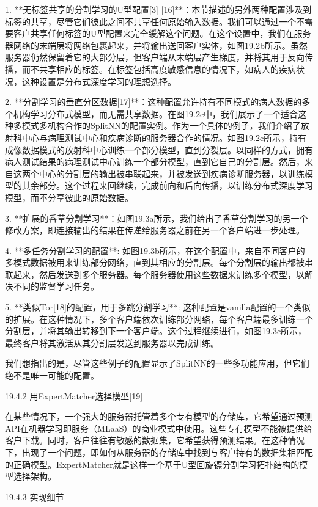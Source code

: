 1. **无标签共享的分割学习的U型配置[3] [16]**：本节描述的另外两种配置涉及到标签的共享，尽管它们彼此之间不共享任何原始输入数据。我们可以通过一个不需要客户共享任何标签的U型配置来完全缓解这个问题。在这个设置中，我们在服务器网络的末端层将网络包裹起来，并将输出送回客户实体，如图19.2b所示。虽然服务器仍然保留着它的大部分层，但客户端从末端层产生梯度，并将其用于反向传播，而不共享相应的标签。在标签包括高度敏感信息的情况下，如病人的疾病状况，这种设置是分布式深度学习的理想选择。

2. **分割学习的垂直分区数据[17]**：这种配置允许持有不同模式的病人数据的多个机构学习分布式模型，而无需共享数据。在图19.2c中，我们展示了一个适合这种多模式多机构合作的SplitNN的配置实例。作为一个具体的例子，我们介绍了放射科中心与病理测试中心和疾病诊断的服务器合作的情况。如图19.2c所示，持有成像数据模式的放射科中心训练一个部分模型，直到分裂层。以同样的方式，拥有病人测试结果的病理测试中心训练一个部分模型，直到它自己的分割层。然后，来自这两个中心的分割层的输出被串联起来，并被发送到疾病诊断服务器，以训练模型的其余部分。这个过程来回继续，完成前向和后向传播，以训练分布式深度学习模型，而不分享彼此的原始数据。

3. **扩展的香草分割学习**：如图19.3a所示，我们给出了香草分割学习的另一个修改方案，即连接输出的结果在传递给服务器之前在另一个客户端进一步处理。

4. **多任务分割学习的配置**: 如图19.3b所示，在这个配置中，来自不同客户的多模式数据被用来训练部分网络，直到其相应的分割层。每个分割层的输出都被串联起来，然后发送到多个服务器。每个服务器使用这些数据来训练多个模型，以解决不同的监督学习任务。

5. **类似Tor[18]的配置，用于多跳分割学习**: 这种配置是vanilla配置的一个类似的扩展。在这种情况下，多个客户端依次训练部分网络，每个客户端最多训练一个分割层，并将其输出转移到下一个客户端。这个过程继续进行，如图19.3c所示，最终客户将其激活从其分割层发送到服务器以完成训练。

我们想指出的是，尽管这些例子的配置显示了SplitNN的一些多功能应用，但它们绝不是唯一可能的配置。

19.4.2 用ExpertMatcher选择模型[19]

在某些情况下，一个强大的服务器托管着多个专有模型的存储库，它希望通过预测API在机器学习即服务（MLaaS）的商业模式中使用。这些专有模型不能被提供给客户下载。同时，客户往往有敏感的数据集，它希望获得预测结果。在这种情况下，出现了一个问题，即如何从服务器的存储库中找到与客户持有的数据集相匹配的正确模型。ExpertMatcher就是这样一个基于U型回旋镖分割学习拓扑结构的模型选择架构。

19.4.3 实现细节

